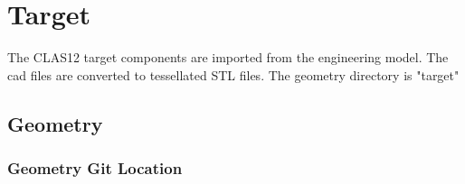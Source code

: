 \section{Target}

The CLAS12 target components are imported from the engineering model. The cad files are converted to tessellated STL files.
The geometry directory is "target"

\subsection{Geometry}

\subsubsection{Geometry Git Location}





